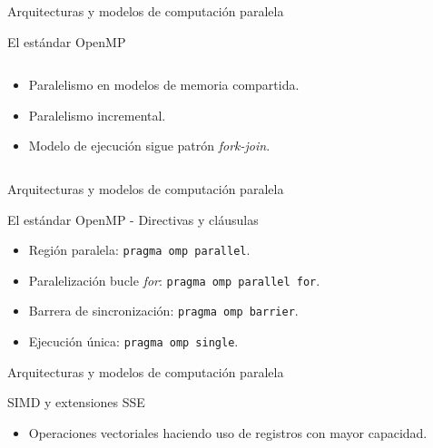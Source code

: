 \begin{frame}{Arquitecturas y modelos de computación paralela}
\begin{block}{El estándar OpenMP}

\begin{columns}

  \begin{column}{.50\textwidth}
\begin{itemize}
  \item Paralelismo en modelos de memoria compartida.
  \item Paralelismo incremental.
  \item Modelo de ejecución sigue patrón \textit{fork-join}.
\end{itemize}
  \end{column}
  
  \begin{column}{.50\textwidth}
	\centerline{}
  \end{column}
  
\end{columns}
\end{block}
\end{frame}

\begin{frame}{Arquitecturas y modelos de computación paralela}
\begin{block}{El estándar OpenMP - Directivas y cláusulas}
\begin{itemize}
  \item Región paralela: \texttt{pragma omp parallel}.
  \item Paralelización bucle \textit{for}: \texttt{pragma omp parallel for}.
  \item Barrera de sincronización: \texttt{pragma omp barrier}.
  \item Ejecución única: \texttt{pragma omp single}.
\end{itemize}
\end{block}
\end{frame}

\begin{frame}{Arquitecturas y modelos de computación paralela}
\begin{block}{SIMD y extensiones SSE}
\begin{itemize}
  \item Operaciones vectoriales haciendo uso de registros con mayor capacidad.
\end{itemize}
  \centerline{}
\end{block}
\end{frame}


